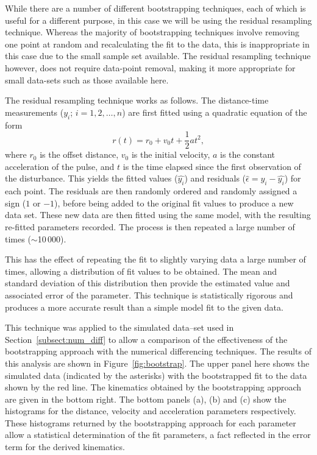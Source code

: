 While there are a number of different bootstrapping techniques, each of which is useful for a different purpose, in this case we will be using the residual resampling technique. Whereas the majority of bootstrapping techniques involve removing one point at random and recalculating the fit to the data, this is inappropriate in this case due to the small sample set available. The residual resampling technique however, does not require data-point removal, making it more appropriate for small data-sets such as those available here.

The residual resampling technique works as follows. The distance-time measurements ($y_i$; $i=1, 2, \ldots, n$) are first fitted using a quadratic equation of the form
\begin{equation}
r(t) = r_0 + v_0 t + \frac{1}{2}a t^2,
\end{equation}
where $r_0$ is the offset distance, $v_0$ is the initial velocity, $a$ is the constant acceleration of the pulse, and $t$ is the time elapsed since the first observation of the disturbance. This yields the fitted values ($\hat{y_{i}}$) and residuals ($\hat{\epsilon}=y_{i} - \hat{y_{i}}$) for each point. The residuals are then randomly ordered and randomly assigned a sign ($1$ or $-1$), before being added to the original fit values to produce a new data set. These new data are then fitted using the same model, with the resulting re-fitted parameters recorded. The process is then repeated a large number of times ($\sim$10\,000).

This has the effect of repeating the fit to slightly varying data a large number of times, allowing a distribution of fit values to be obtained. The mean and standard deviation of this distribution then provide the estimated value and associated error of the parameter. This technique is statistically rigorous and produces a more accurate result than a simple model fit to the given data. 

This technique was applied to the simulated data--set used in Section~\ref{subsect:num_diff} to allow a comparison of the effectiveness of the bootstrapping approach with the numerical differencing techniques. The results of this analysis are shown in Figure~\ref{fig:bootstrap}. The upper panel here shows the simulated data (indicated by the asterisks) with the bootstrapped fit to the data shown by the red line. The kinematics obtained by the bootstrapping approach are given in the bottom right. The bottom panels (a), (b) and (c) show the histograms for the distance, velocity and acceleration parameters respectively. These histograms returned by the bootstrapping approach for each parameter allow a statistical determination of the fit parameters, a fact reflected in the error term for the derived kinematics. 

